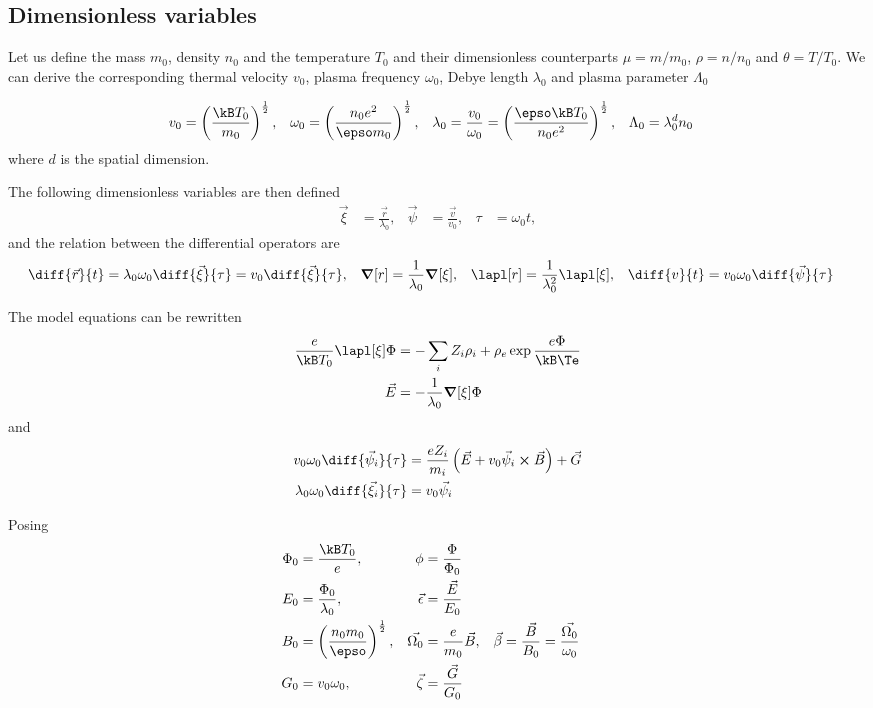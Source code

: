 \documentclass[10pt,a4paper]{article}
\begin{document}
\subsection{Dimensionless variables}

Let us define the mass $m_0$, density $n_0$ and the temperature $T_0$ and 
their dimensionless counterparts $\mu=m/m_0$, $\rho=n/n_0$ and
$\theta=T/T_0$. We can derive the corresponding thermal velocity $v_0$, 
plasma frequency $\omega_0$, Debye length $\lambda_0$ and plasma
parameter $\Lambda_0$

\begin{align*}
v_0&=\left(\frac{\kB T_0}{m_0}\right)^\frac{1}{2}, &
\omega_0&=\left(\frac{n_0e^2}{\epso m_0}\right)^\frac{1}{2}, &
\lambda_0&=\frac{v_0}{\omega_0}=
\left(\frac{\epso\kB T_0}{n_0e^2}\right)^\frac{1}{2}, &
\Lambda_0&=\lambda_0^d n_0
\end{align*}
where $d$ is the spatial dimension.

The following dimensionless variables are then defined
\begin{align*}
\vec{\xi}&=\frac{\vec{r}}{\lambda_0}, &
\vec{\psi}&=\frac{\vec{v}}{v_0}, &
\tau&=\omega_0 t,
\end{align*}
and the relation between the differential operators are
\begin{align*}
\diff{\vec{r}}{t}&=\lambda_0\omega_0\diff{\vec{\xi}}{\tau}=
v_0\diff{\vec{\xi}}{\tau}, &
\grad[r]&=\frac{1}{\lambda_0}\grad[\xi], & 
\lapl[r]&=\frac{1}{\lambda_0^2}\lapl[\xi], &
\diff{v}{t}&=v_0\omega_0\diff{\vec{\psi}}{\tau}
\end{align*}

The model equations can be rewritten 
\begin{align}
\frac{e}{\kB T_0}\lapl[\xi]\Phi&=
-\sum_iZ_i\rho_i+\rho_e\exp\frac{e\Phi}{\kB\Te}\\
\vec{E}&=-\frac{1}{\lambda_0}\grad[\xi]\Phi 
\end{align}
and
\begin{align}
v_0\omega_0\diff{\vec{\psi}_i}{\tau}&=\frac{eZ_i}{m_i}
\left(\vec{E}+v_0\vec{\psi}_i\cross\vec{B}\right)+\vec{G}\\
\lambda_0\omega_0\diff{\vec{\xi}_i}{\tau}&=v_0\vec{\psi}_i
\end{align}

Posing
\begin{align*}
\Phi_0&=\frac{\kB T_0}{e},&
\phi&=\frac{\Phi}{\Phi_0} &\\
E_0&=\frac{\Phi_0}{\lambda_0},&
\vec{\epsilon}&=\frac{\vec{E}}{E_0} &\\
B_0&=\left(\frac{n_0m_0}{\epso}\right)^\frac{1}{2},&
\vec{\Omega_0}&=\frac{e}{m_0}\vec{B},&
\vec{\beta}&=\frac{\vec{B}}{B_0}=\frac{\vec{\Omega_0}}{\omega_0} &\\
G_0&=v_0\omega_0, &
\vec{\zeta}&=\frac{\vec{G}}{G_0}
\end{align*}
\end{document}
